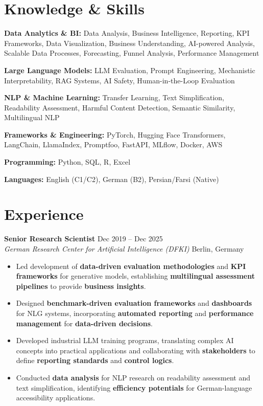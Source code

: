 \documentclass[11pt,a4paper]{article}
\newcommand{\cvitem}[1]{
    \item #1
}
\newcommand{\role}[4]{
    \textbf{#1} \hfill {\small #2} \\
    \textit{#3} \hfill {\small #4}
}
\begin{document}
\vspace{0.7em}

\section*{Knowledge \& Skills}

\textbf{Data Analytics \& BI:} 
Data Analysis, Business Intelligence, Reporting, KPI Frameworks, Data Visualization, Business Understanding, AI-powered Analysis, Scalable Data Processes, Forecasting, Funnel Analysis, Performance Management

\textbf{Large Language Models:} 
LLM Evaluation, Prompt Engineering, Mechanistic Interpretability, RAG Systems, AI Safety, Human-in-the-Loop Evaluation

\textbf{NLP \& Machine Learning:} 
Transfer Learning, Text Simplification, Readability Assessment, Harmful Content Detection, Semantic Similarity, Multilingual NLP

\textbf{Frameworks \& Engineering:} 
PyTorch, Hugging Face Transformers, LangChain, LlamaIndex, Promptfoo, FastAPI, MLflow, Docker, AWS

\textbf{Programming:} 
Python, SQL, R, Excel

\textbf{Languages:} 
English (C1/C2), German (B2), Persian/Farsi (Native)

\vspace{0.7em}

\section*{Experience}

\role
{Senior Research Scientist}
{Dec 2019 -- Dec 2025}
{German Research Center for Artificial Intelligence (DFKI)}
{Berlin, Germany}

\begin{itemize}
    \cvitem{Led development of \textbf{data-driven evaluation methodologies} and \textbf{KPI frameworks} for generative models, establishing \textbf{multilingual assessment pipelines} to provide \textbf{business insights}.}

    \cvitem{Designed \textbf{benchmark-driven evaluation frameworks} and \textbf{dashboards} for NLG systems, incorporating \textbf{automated reporting} and \textbf{performance management} for \textbf{data-driven decisions}.}

    \cvitem{Developed industrial LLM training programs, translating complex AI concepts into practical applications and collaborating with \textbf{stakeholders} to define \textbf{reporting standards} and \textbf{control logics}.}

    \cvitem{Conducted \textbf{data analysis} for NLP research on readability assessment and text simplification, identifying \textbf{efficiency potentials} for German-language accessibility applications.}
\end{itemize}
\end{document}
